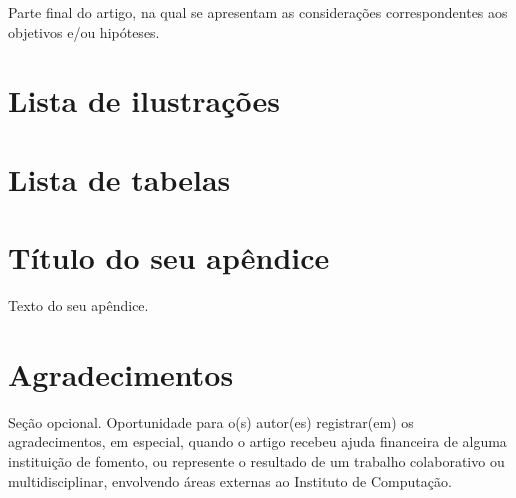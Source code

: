 \documentclass[article,a4paper,12pt,brazil,sumario=tradicional]{abntex2}
\begin{document}
Parte final do artigo, na qual se apresentam as considerações correspondentes aos objetivos e/ou hipóteses.

\newpage


\begin{appendices}

\newpage
\chapter{Lista de ilustrações}
\vspace{-35pt}
\renewcommand{\listfigurename}{}
\listoffigures

\newpage
\chapter{Lista de tabelas}
\vspace{-35pt}
\renewcommand{\listtablename}{}
\listoftables


\newpage
\chapter{Título do seu apêndice}
Texto do seu apêndice.

\end{appendices}

\newpage
\chapter*{Agradecimentos}
\noindent
Seção opcional. Oportunidade para o(s) autor(es) registrar(em) os agradecimentos, em especial, quando o artigo recebeu ajuda financeira de alguma instituição de fomento, ou represente o resultado de um trabalho colaborativo ou multidisciplinar, envolvendo áreas externas ao Instituto de Computação.
\end{document}
